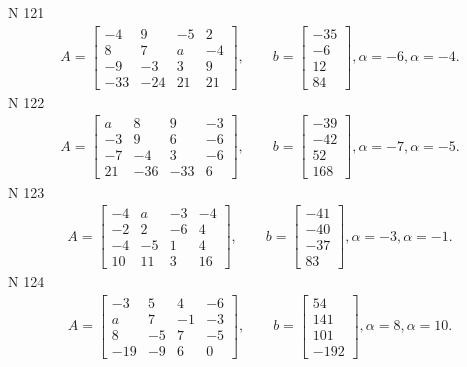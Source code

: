 \documentclass[11pt]{report}
\begin{document}
N 121
\begin{align*}
 A = \left[\begin{matrix}-4 & 9 & -5 & 2\\8 & 7 & a & -4\\-9 & -3 & 3 & 9\\-33 & -24 & 21 & 21\end{matrix}\right],
    \qquad b = \left[\begin{matrix}-35\\-6\\12\\84\end{matrix}\right], \alpha = -6, \alpha = -4. 
 \end{align*}
N 122
\begin{align*}
 A = \left[\begin{matrix}a & 8 & 9 & -3\\-3 & 9 & 6 & -6\\-7 & -4 & 3 & -6\\21 & -36 & -33 & 6\end{matrix}\right],
    \qquad b = \left[\begin{matrix}-39\\-42\\52\\168\end{matrix}\right], \alpha = -7, \alpha = -5. 
 \end{align*}
N 123
\begin{align*}
 A = \left[\begin{matrix}-4 & a & -3 & -4\\-2 & 2 & -6 & 4\\-4 & -5 & 1 & 4\\10 & 11 & 3 & 16\end{matrix}\right],
    \qquad b = \left[\begin{matrix}-41\\-40\\-37\\83\end{matrix}\right], \alpha = -3, \alpha = -1. 
 \end{align*}
N 124
\begin{align*}
 A = \left[\begin{matrix}-3 & 5 & 4 & -6\\a & 7 & -1 & -3\\8 & -5 & 7 & -5\\-19 & -9 & 6 & 0\end{matrix}\right],
    \qquad b = \left[\begin{matrix}54\\141\\101\\-192\end{matrix}\right], \alpha = 8, \alpha = 10. 
 \end{align*}
\end{document}
